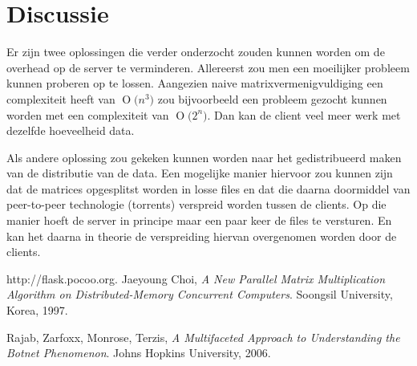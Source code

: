 \documentclass[11pt]{article}
\newcommand{\BigO}[1]{\ensuremath{\operatorname{O}\bigl(#1\bigr)}}
\begin{document}
\section{Discussie}
Er zijn twee oplossingen die verder onderzocht zouden kunnen worden om de
overhead op de server te verminderen. Allereerst zou men een moeilijker probleem
kunnen proberen op te lossen. Aangezien naive matrixvermenigvuldiging een
complexiteit heeft van $\BigO{n^3}$ zou bijvoorbeeld een probleem gezocht
kunnen worden met een complexiteit van $\BigO{2^n}$. Dan kan de client veel meer
werk met dezelfde hoeveelheid data.

Als andere oplossing zou gekeken kunnen worden naar het gedistribueerd maken van
de distributie van de data. Een mogelijke manier hiervoor zou kunnen zijn dat de
matrices opgesplitst worden in losse files en dat die daarna doormiddel van
peer-to-peer technologie (torrents) verspreid worden tussen de clients. Op die
manier hoeft de server in principe maar een paar keer de files te versturen. En
kan het daarna in theorie de verspreiding hiervan overgenomen worden door de
clients.


\begin{thebibliography}{9}

  http://flask.pocoo.org.
  Jaeyoung Choi,
  \emph{A New Parallel Matrix Multiplication Algorithm on Distributed-Memory Concurrent Computers}.
  Soongsil University, Korea,
  1997.

  Rajab, Zarfoxx, Monrose, Terzis,
  \emph{A Multifaceted Approach to Understanding the Botnet Phenomenon}.
  Johns Hopkins University,
  2006.


\end{thebibliography}
\end{document}
